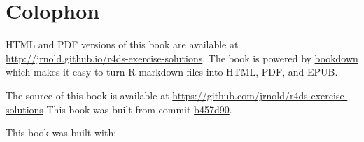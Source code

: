 \documentclass[]{book}
\theoremstyle{plain}
\theoremstyle{remark}
\begin{document}
\hypertarget{colophon}{%
\section*{Colophon}\label{colophon}}

HTML and PDF versions of this book are available at
\url{http://jrnold.github.io/r4ds-exercise-solutions}. The book is
powered by \href{https://bookdown.org}{bookdown} which makes it easy to
turn R markdown files into HTML, PDF, and EPUB.

The source of this book is available at
\url{https://github.com/jrnold/r4ds-exercise-solutions} This book was
built from commit
\href{https://github.com/jrnold/r4ds-exercise-solutions/tree/b457d90110cb86e5274c7c6fab56db0034c15e52}{b457d90}.

This book was built with:
\end{document}
